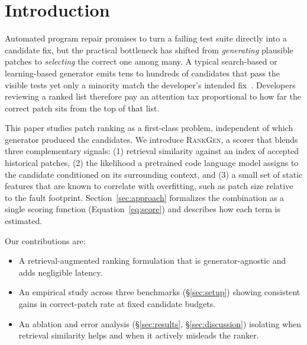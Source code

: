 \section{Introduction}
Automated program repair promises to turn a failing test suite directly into a candidate fix, but the practical bottleneck has shifted from \emph{generating} plausible patches to \emph{selecting} the correct one among many. A typical search-based or learning-based generator emits tens to hundreds of candidates that pass the visible tests yet only a minority match the developer's intended fix~\cite{oyelaran2020overfitting,alvarez2019classifier}. Developers reviewing a ranked list therefore pay an attention tax proportional to how far the correct patch sits from the top of that list.

This paper studies patch ranking as a first-class problem, independent of which generator produced the candidates. We introduce \textsc{RankGen}, a scorer that blends three complementary signals: (1) retrieval similarity against an index of accepted historical patches, (2) the likelihood a pretrained code language model assigns to the candidate conditioned on its surrounding context, and (3) a small set of static features that are known to correlate with overfitting, such as patch size relative to the fault footprint. Section~\ref{sec:approach} formalizes the combination as a single scoring function (Equation~\ref{eq:score}) and describes how each term is estimated.

Our contributions are:
\begin{itemize}
  \item A retrieval-augmented ranking formulation that is generator-agnostic and adds negligible latency.
  \item An empirical study across three benchmarks (\S\ref{sec:setup}) showing consistent gains in correct-patch rate at fixed candidate budgets.
  \item An ablation and error analysis (\S\ref{sec:results}, \S\ref{sec:discussion}) isolating when retrieval similarity helps and when it actively misleads the ranker.
\end{itemize}

